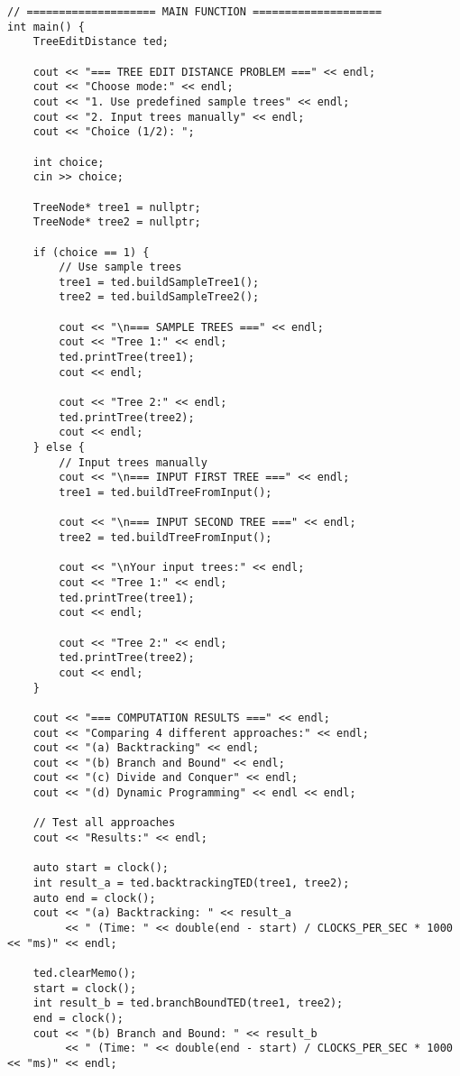 \documentclass[12pt]{article}
\begin{document}
\begin{lstlisting}[caption=Complete Tree Edit Distance Implementation]
// ==================== MAIN FUNCTION ====================
int main() {
    TreeEditDistance ted;
    
    cout << "=== TREE EDIT DISTANCE PROBLEM ===" << endl;
    cout << "Choose mode:" << endl;
    cout << "1. Use predefined sample trees" << endl;
    cout << "2. Input trees manually" << endl;
    cout << "Choice (1/2): ";
    
    int choice;
    cin >> choice;
    
    TreeNode* tree1 = nullptr;
    TreeNode* tree2 = nullptr;
    
    if (choice == 1) {
        // Use sample trees
        tree1 = ted.buildSampleTree1();
        tree2 = ted.buildSampleTree2();
        
        cout << "\n=== SAMPLE TREES ===" << endl;
        cout << "Tree 1:" << endl;
        ted.printTree(tree1);
        cout << endl;
        
        cout << "Tree 2:" << endl;
        ted.printTree(tree2);
        cout << endl;
    } else {
        // Input trees manually
        cout << "\n=== INPUT FIRST TREE ===" << endl;
        tree1 = ted.buildTreeFromInput();
        
        cout << "\n=== INPUT SECOND TREE ===" << endl;
        tree2 = ted.buildTreeFromInput();
        
        cout << "\nYour input trees:" << endl;
        cout << "Tree 1:" << endl;
        ted.printTree(tree1);
        cout << endl;
        
        cout << "Tree 2:" << endl;
        ted.printTree(tree2);
        cout << endl;
    }
    
    cout << "=== COMPUTATION RESULTS ===" << endl;
    cout << "Comparing 4 different approaches:" << endl;
    cout << "(a) Backtracking" << endl;
    cout << "(b) Branch and Bound" << endl;
    cout << "(c) Divide and Conquer" << endl;
    cout << "(d) Dynamic Programming" << endl << endl;
    
    // Test all approaches
    cout << "Results:" << endl;
    
    auto start = clock();
    int result_a = ted.backtrackingTED(tree1, tree2);
    auto end = clock();
    cout << "(a) Backtracking: " << result_a 
         << " (Time: " << double(end - start) / CLOCKS_PER_SEC * 1000 << "ms)" << endl;
    
    ted.clearMemo();
    start = clock();
    int result_b = ted.branchBoundTED(tree1, tree2);
    end = clock();
    cout << "(b) Branch and Bound: " << result_b 
         << " (Time: " << double(end - start) / CLOCKS_PER_SEC * 1000 << "ms)" << endl;
    

\end{lstlisting}
\end{document}
